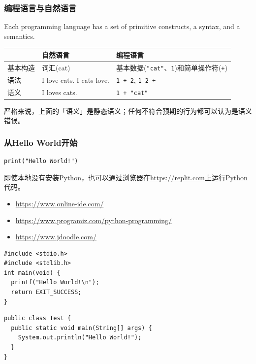 \documentclass[aspectratio=169, 14pt]{beamer}
\begin{document}
\begin{frame}
	\frametitle{编程语言与自然语言}
	Each programming language has a set of primitive constructs, a syntax, and a semantics.

	\begin{tabular}{l l p{2in}}
		\toprule
		     & \textbf{自然语言}                     & \textbf{编程语言}                                       \\
		\midrule
		基本构造 & 词汇(cat)                           & 基本数据(\texttt{"cat"}、\texttt{1})和简单操作符({\texttt{+}}) \\
		语法   & I love cats. \alert{I cats love}. & \texttt{1 + 2}, \alert{\texttt{1 2 +}}              \\
		语义   & \alert{I loves cats}.             & \texttt{1 + "cat"}                                  \\
		\bottomrule
	\end{tabular}

	严格来说，上面的「语义」是\alert{静态语义}；任何不符合预期的行为都可以认为是语义错误。
\end{frame}

\begin{frame}[fragile]
	\frametitle{从Hello World开始}
	\begin{verbatim}
print("Hello World!")
  \end{verbatim}
	即使本地没有安装Python，也可以通过浏览器在\url{https://replit.com}上运行Python代码。
	\begin{itemize}
		\item \url{https://www.online-ide.com/}
		\item \url{https://www.programiz.com/python-programming/}
		\item \url{https://www.jdoodle.com/}
	\end{itemize}

\end{frame}

\begin{frame}[fragile]

	\begin{verbatim}
#include <stdio.h>
#include <stdlib.h>
int main(void) {
  printf("Hello World!\n");
  return EXIT_SUCCESS;
}
  \end{verbatim}

	\begin{verbatim}
public class Test {
  public static void main(String[] args) {
    System.out.println("Hello World!");
  }
}
  \end{verbatim}
\end{frame}
\end{document}
